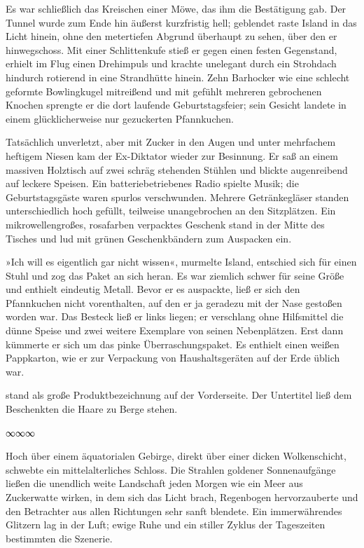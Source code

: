Es war schließlich das Kreischen einer Möwe, das ihm die Bestätigung gab. Der Tunnel wurde zum Ende hin äußerst kurzfristig hell; geblendet raste Island in das Licht hinein, ohne den metertiefen Abgrund überhaupt zu sehen, über den er hinwegschoss. Mit einer Schlittenkufe stieß er gegen einen festen Gegenstand, erhielt im Flug einen Drehimpuls und krachte unelegant durch ein Strohdach hindurch rotierend in eine Strandhütte hinein. Zehn Barhocker wie eine schlecht geformte Bowlingkugel mitreißend und mit gefühlt mehreren gebrochenen Knochen sprengte er die dort laufende Geburtstagsfeier; sein Gesicht landete in einem glücklicherweise nur gezuckerten Pfannkuchen.

Tatsächlich unverletzt, aber mit Zucker in den Augen und unter mehrfachem heftigem Niesen kam der Ex-Diktator wieder zur Besinnung. Er saß an einem massiven Holztisch auf zwei schräg stehenden Stühlen und blickte augenreibend auf leckere Speisen. Ein batteriebetriebenes Radio spielte Musik; die Geburtstagsgäste waren spurlos verschwunden. Mehrere Getränkegläser standen unterschiedlich hoch gefüllt, teilweise unangebrochen an den Sitzplätzen. Ein mikrowellengroßes, rosafarben verpacktes Geschenk stand in der Mitte des Tisches und lud mit grünen Geschenkbändern zum Auspacken ein.

»Ich will es eigentlich gar nicht wissen«, murmelte Island, entschied sich für einen Stuhl und zog das Paket an sich heran. Es war ziemlich schwer für seine Größe und enthielt eindeutig Metall. Bevor er es auspackte, ließ er sich den Pfannkuchen nicht vorenthalten, auf den er ja geradezu mit der Nase gestoßen worden war. Das Besteck ließ er links liegen; er verschlang ohne Hilfsmittel die dünne Speise und zwei weitere Exemplare von seinen Nebenplätzen. Erst dann kümmerte er sich um das pinke Überraschungspaket. Es enthielt einen weißen Pappkarton, wie er zur Verpackung von Haushaltsgeräten auf der Erde üblich war.

 stand als große Produktbezeichnung auf der Vorderseite. Der Untertitel ließ dem Beschenkten die Haare zu Berge stehen. 

\begin{center}
∞∞∞
\end{center}

Hoch über einem äquatorialen Gebirge, direkt über einer dicken Wolkenschicht, schwebte ein mittelalterliches Schloss. Die Strahlen goldener Sonnenaufgänge ließen die unendlich weite Landschaft jeden Morgen wie ein Meer aus Zuckerwatte wirken, in dem sich das Licht brach, Regenbogen hervorzauberte und den Betrachter aus allen Richtungen sehr sanft blendete. Ein immerwährendes Glitzern lag in der Luft; ewige Ruhe und ein stiller Zyklus der Tageszeiten bestimmten die Szenerie.

